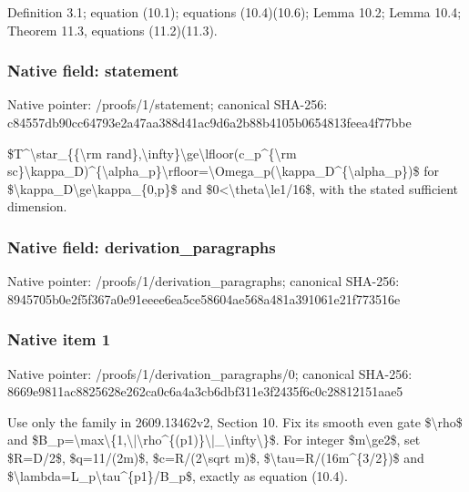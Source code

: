 \documentclass[10pt,a4paper]{article}
\begin{document}
Definition 3.1; equation (10.1); equations (10.4)(10.6); Lemma 10.2; Lemma 10.4; Theorem 11.3, equations (11.2)(11.3).


\subsubsection{Native field: statement}


Native pointer: /proofs/1/statement; canonical SHA-256: c84557db90cc64793e2a47aa\allowbreak{}388d41ac9d6a2b88b4105b06\allowbreak{}54813feea4f77bbe


\$T\textasciicircum{}\textbackslash{}star\_\{\{\textbackslash{}rm rand\},\textbackslash{}infty\}\textbackslash{}ge\textbackslash{}lfloor(c\_p\textasciicircum{}\{\textbackslash{}rm sc\}\textbackslash{}kappa\_D)\textasciicircum{}\{\textbackslash{}alpha\_p\}\textbackslash{}\allowbreak{}rfloor=\textbackslash{}Omega\_p(\textbackslash{}kappa\_D\allowbreak{}\textasciicircum{}\{\textbackslash{}alpha\_p\})\$ for \$\textbackslash{}kappa\_D\textbackslash{}ge\textbackslash{}kappa\_\{0,p\}\$ and \$0<\textbackslash{}theta\textbackslash{}le1/16\$, with the stated sufficient dimension.


\subsubsection{Native field: derivation\_paragraphs}


Native pointer: /proofs/1/derivation\_paragraphs; canonical SHA-256: 8945705b0e2f5f367a0e91ee\allowbreak{}ee6ea5ce58604ae568a481a3\allowbreak{}91061e21f773516e



\subsubsection{Native item 1}


Native pointer: /proofs/1/derivation\_paragraphs/0; canonical SHA-256: 8669e9811ac8825628e262ca\allowbreak{}0c6a4a3cb6dbf311e3f2435f\allowbreak{}6c0c28812151aae5


Use only the family in 2609.13462v2, Section 10. Fix its smooth even gate \$\textbackslash{}rho\$ and \$B\_p=\textbackslash{}max\textbackslash{}\{1,\textbackslash{}|\textbackslash{}rho\textasciicircum{}\{(p\allowbreak{}1)\}\textbackslash{}|\_\textbackslash{}infty\textbackslash{}\}\$. For integer \$m\textbackslash{}ge2\$, set \$R=D/2\$, \$q=11/(2m)\$, \$c=R/(2\textbackslash{}sqrt m)\$, \$\textbackslash{}tau=R/(16m\textasciicircum{}\{3/2\})\$ and \$\textbackslash{}lambda=L\_p\textbackslash{}tau\textasciicircum{}\{p1\}/B\_p\$, exactly as equation (10.4).
\end{document}
